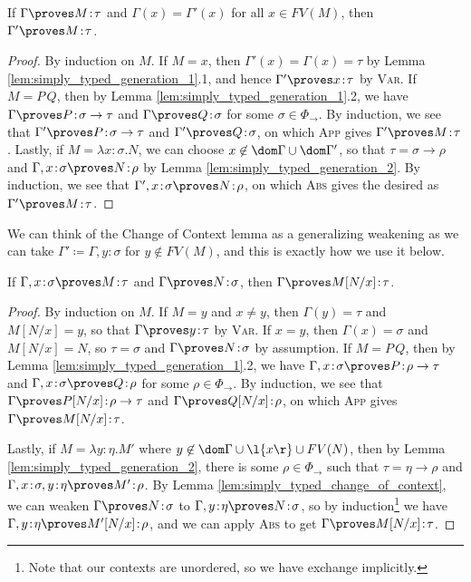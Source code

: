 \documentclass[reqno]{amsart}
\begin{document}
    \begin{lemma}\label{lem:simply_typed_change_of_context}
        If $\Gamma\proves M\!:\!\tau$ and $\Gamma(x)=\Gamma'(x)$ for all $x\in FV(M)$, then $\Gamma'\proves M\!:\!\tau$.
    \end{lemma}
    \begin{proof}
        By induction on $M$. If $M=x$, then $\Gamma'(x)=\Gamma(x)=\tau$ by Lemma \ref{lem:simply_typed_generation_1}.1, and hence $\Gamma'\proves x\!:\!\tau$ by \textsc{Var}. If $M=P\,Q$, then by Lemma \ref{lem:simply_typed_generation_1}.2, we have $\Gamma\proves P\!:\!\sigma\rightarrow\tau$ and $\Gamma\proves Q\!:\!\sigma$ for some $\sigma\in\Phi_\rightarrow$. By induction, we see that $\Gamma'\proves P\!:\!\sigma\to\tau$ and $\Gamma'\proves Q\!:\!\sigma$, on which \textsc{App} gives $\Gamma'\proves M\!:\!\tau$. Lastly, if $M=\lambda x\!:\!\sigma.N$, we can choose $x\not\in\dom\Gamma\cup\dom\Gamma'$, so that $\tau=\sigma\rightarrow\rho$ and $\Gamma,x\!:\!\sigma\proves N\!:\!\rho$ by Lemma \ref{lem:simply_typed_generation_2}. By induction, we see that $\Gamma',x\!:\!\sigma\proves N\!:\!\rho$, on which \textsc{Abs} gives the desired as $\Gamma'\proves M\!:\!\tau$.
    \end{proof}

    We can think of the Change of Context lemma as a generalizing weakening as we can take $\Gamma'\coloneqq\Gamma,y\!:\!\sigma$ for $y\not\in FV(M)$, and this is exactly how we use it below.

    \begin{lemma}\label{lem:simply_typed_substitution}
        If $\Gamma,x\!:\!\sigma\proves M\!:\!\tau$ and $\Gamma\proves N\!:\!\sigma$, then $\Gamma\proves M[N/x]\!:\!\tau$.
    \end{lemma}
    \begin{proof}
        By induction on $M$. If $M=y$ and $x\neq y$, then $\Gamma(y)=\tau$ and $M[N/x]=y$, so that $\Gamma\proves y\!:\!\tau$ by \textsc{Var}. If $x=y$, then $\Gamma(x)=\sigma$ and $M[N/x]=N$, so $\tau=\sigma$ and $\Gamma\proves N\!:\!\sigma$ by assumption. If $M=P\,Q$, then by Lemma \ref{lem:simply_typed_generation_1}.2, we have $\Gamma,x\!:\!\sigma\proves P\!:\!\rho\rightarrow\tau$ and $\Gamma,x\!:\!\sigma\proves Q\!:\!\rho$ for some $\rho\in\Phi_\rightarrow$. By induction, we see that $\Gamma\proves P[N/x]\!:\!\rho\to\tau$ and $\Gamma\proves Q[N/x]\!:\!\rho$, on which \textsc{App} gives $\Gamma\proves M[N/x]\!:\!\tau$.

        Lastly, if $M=\lambda y\!:\!\eta.M'$ where $y\not\in\dom\Gamma\cup\l\{x\r\}\cup FV(N)$, then by Lemma \ref{lem:simply_typed_generation_2}, there is some $\rho\in\Phi_\rightarrow$ such that $\tau=\eta\rightarrow\rho$ and $\Gamma,x\!:\!\sigma,y\!:\!\eta\proves M'\!:\!\rho$. By Lemma \ref{lem:simply_typed_change_of_context}, we can weaken $\Gamma\proves N\!:\!\sigma$ to $\Gamma,y\!:\!\eta\proves N\!:\!\sigma$, so by induction\footnote{Note that our contexts are unordered, so we have exchange implicitly.} we have $\Gamma,y\!:\!\eta\proves M'[N/x]\!:\!\rho$, and we can apply \textsc{Abs} to get $\Gamma\proves M[N/x]\!:\!\tau$.
    \end{proof}
\end{document}
